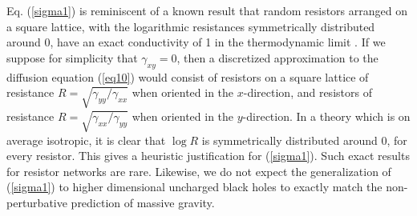 \documentclass[10pt, oneside]{book}
\begin{document}
\begin{doublespace}
Eq. (\ref{sigma1})  is reminiscent of a known result that random resistors arranged on a square lattice, with the logarithmic resistances symmetrically distributed around 0, have an exact conductivity of 1 in the thermodynamic limit \cite{tyc}.     If we suppose for simplicity that $\gamma_{xy}=0$, then a discretized approximation to the diffusion equation (\ref{eq10}) would consist of resistors on a square lattice of resistance $R=\sqrt{\gamma_{yy}/\gamma_{xx}}$ when oriented in the $x$-direction, and resistors of resistance $R=\sqrt{\gamma_{xx}/\gamma_{yy}}$ when oriented in the $y$-direction.   In a theory which is on average isotropic, it is clear that $\log R$ is symmetrically distributed around 0, for every resistor.    This gives a heuristic justification for (\ref{sigma1}).   Such exact results for resistor networks are rare.   Likewise, we do not expect the generalization of (\ref{sigma1}) to higher dimensional uncharged black holes to exactly match the non-perturbative prediction of massive gravity.


\end{doublespace}
\end{document}
